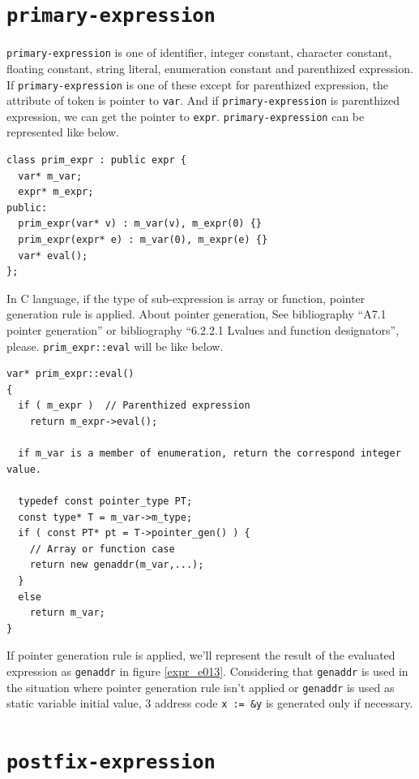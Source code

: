 \section{\tt{primary-expression}}
\label{expr_e015}
{\tt{primary-expression}} is one of identifier, integer constant,
character constant, floating constant, string literal, enumeration
constant and parenthized expression. If {\tt{primary-expression}} is 
one of these except for parenthized expression, the attribute of token
is pointer to {\tt{var}}. And if {\tt{primary-expression}} is 
parenthized expression, we can get the pointer to {\tt{expr}}.
{\tt{primary-expression}} can be represented like below.
\begin{verbatim}
class prim_expr : public expr {
  var* m_var;
  expr* m_expr;
public:
  prim_expr(var* v) : m_var(v), m_expr(0) {}
  prim_expr(expr* e) : m_var(0), m_expr(e) {}
  var* eval();
};
\end{verbatim}

In C language, if the type of sub-expression is array or function,
pointer generation rule is applied. About pointer generation,
See bibliography
\cite{KR} ``A7.1 pointer generation'' or
bibliography \cite{ISO} ``6.2.2.1 Lvalues and function designators'', please.
{\tt{prim\_expr::eval}} will be like below.
\begin{verbatim}
var* prim_expr::eval()
{
  if ( m_expr )  // Parenthized expression
    return m_expr->eval();

  if m_var is a member of enumeration, return the correspond integer value.

  typedef const pointer_type PT;
  const type* T = m_var->m_type;
  if ( const PT* pt = T->pointer_gen() ) {
    // Array or function case
    return new genaddr(m_var,...);
  }
  else
    return m_var;
}
\end{verbatim}
If pointer generation rule is applied, we'll represent the result of
the evaluated expression as {\tt{genaddr}} in figure \ref{expr_e013}.
Considering that {\tt{genaddr}} is used in the situation
where pointer generation rule isn't applied or {\tt{genaddr}} is used
as static variable initial value,
3 address code {\tt{x := \&y}} is generated only if necessary.

\section{\tt{postfix-expression}}

